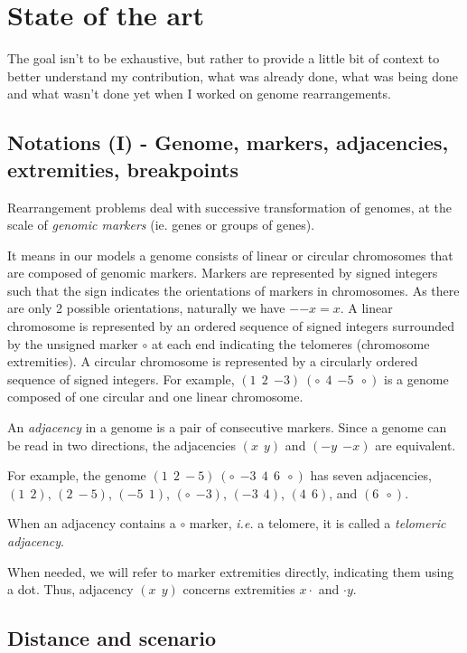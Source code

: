 \documentclass[11pt,final,twoside,nofrench]{thlifl}
\begin{document}
\chapter[State of the art]{State of the art}

The goal isn't to be exhaustive, but rather to provide a little bit of context to better understand my contribution, what was already done, what was being done and what wasn't done yet when I worked on genome rearrangements.

\section{Notations (I) - Genome, markers, adjacencies, extremities, breakpoints}
\label{sec:notations}

Rearrangement problems deal with successive transformation of genomes, at the scale of \emph{genomic markers} (ie. genes or groups of genes).

It means in our models a genome consists of linear or circular chromosomes that are composed of
genomic markers. Markers are represented by signed integers such that the sign
indicates the orientations of markers in chromosomes. As there are only 2 possible orientations, naturally we have ${-{-x}}=
x$. A linear chromosome is represented by an ordered sequence of signed integers
surrounded by the unsigned marker $\circ$  at each end indicating the telomeres (chromosome extremities).
A circular chromosome is represented by a circularly ordered sequence of signed
integers. 
For example, $(1~~2~~{-3}) ~ (\circ~~4~~{-5}~~\circ)$ is a genome composed of
one circular and one linear chromosome.

An \emph{adjacency} in a genome is a pair of consecutive markers. Since a genome
can be read in two directions, the adjacencies $(x~~y)$ and $({-y}~~{-x})$ are
equivalent.

For example, the genome $(1~~2~-5) ~
(\circ~~{-3}~~4~~6~~\circ)$ has seven adjacencies, $(1~~2)$,
$(2~-5)$, $(-5~~1)$, $(\circ~~{-3})$, $({-3}~~4)$,
$(4~~6)$, and $(6~~\circ)$.

When an adjacency contains a $\circ$ marker, \textit{i.e.} a telomere, it is
called a \emph{telomeric adjacency}.

When needed, we will refer to marker extremities directly, indicating them using a dot. Thus, adjacency $(x~~y)$ concerns extremities $x\cdot$ and $\cdot y$.

\section{Distance and scenario}
\end{document}
